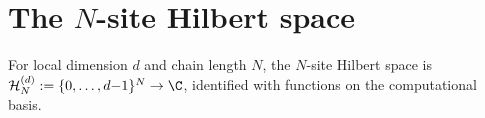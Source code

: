 \section{The $N$-site Hilbert space}

\begin{definition}\label{def:nsite_space_parent}
    \leanok
    For local dimension $d$ and chain length $N$, the $N$-site Hilbert space is
    $\mathcal H_{N}^{(d)}:=\{0,\ldots,d{-}1\}^{N}\to\C$,
    identified with functions on the computational basis.
\end{definition}



